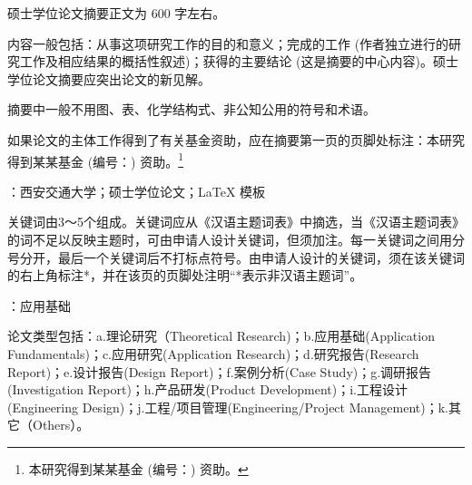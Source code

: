 
\setcounter{page}{1}

硕士学位论文摘要正文为 600 字左右。

内容一般包括：从事这项研究工作的目的和意义；完成的工作 (作者独立进行的研究工作及相应结果的概括性叙述)；获得的主要结论 (这是摘要的中心内容)。硕士学位论文摘要应突出论文的新见解。

摘要中一般不用图、表、化学结构式、非公知公用的符号和术语。

如果论文的主体工作得到了有关基金资助，应在摘要第一页的页脚处标注：本研究得到某某基金 (编号：) 资助。\footnote{本研究得到某某基金 (编号：) 资助。}


\vspace{\baselineskip}
：西安交通大学；硕士学位论文；\LaTeX{} 模板

{\color{red} 关键词由3～5个组成。关键词应从《汉语主题词表》中摘选，当《汉语主题词表》的词不足以反映主题时，可由申请人设计关键词，但须加注。每一关键词之间用分号分开，最后一个关键词后不打标点符号。由申请人设计的关键词，须在该关键词的右上角标注*，并在该页的页脚处注明“*表示非汉语主题词”。}

\vspace{\baselineskip}
：应用基础

{\color{red} 论文类型包括：a.理论研究（Theoretical Research)；b.应用基础(Application Fundamentals)；c.应用研究(Application Research)；d.研究报告(Research Report)；e.设计报告(Design Report)；f.案例分析(Case Study)；g.调研报告(Investigation Report)；h.产品研发(Product Development)；i.工程设计(Engineering Design)；j.工程/项目管理(Engineering/Project Management)；k.其它（Others）。}

\clearpage





